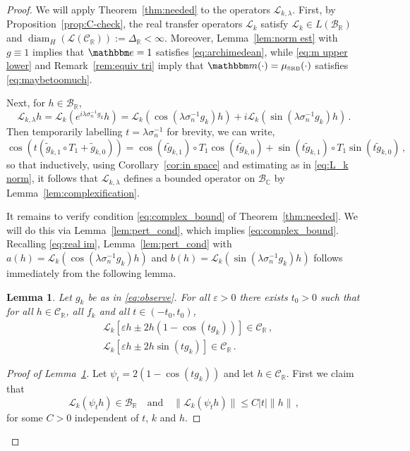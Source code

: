 \documentclass{amsart}
\numberwithin{equation}{section}
\newtheorem{lem}[thm]{Lemma}
\newcommand\cB{{\mathcal B}}
\newcommand\cC{{\mathcal C}}
\newcommand\cL{{\mathcal L}}
\newcommand\bC{{\mathbb C}}
\newcommand\bR{{\mathbb R}}
\newcommand\ve{\varepsilon}
\newcommand{\bbe}{\mathbbm e}
\newcommand{\bbm}{\mathbbm m}
\newcommand{\musrb}{\mu_{\mbox{\tiny SRB}}}
\newcommand{\diam}{\operatorname{diam}}
\begin{document}
\begin{proof}
We will apply Theorem~\ref{thm:needed} to the operators $\cL_{k, \lambda}$.
First, by Proposition~\ref{prop:C-check}, the real transfer operators $\cL_k$ satisfy
$\cL_k \in L(\cB_{\bR})$ and $\diam_H(\cL(\cC_{\bR})) := \Delta_{\bR} < \infty$.
Moreover, Lemma~\ref{lem:norm est} with $g \equiv 1$ implies that $\bbe = 1$ satisfies
\eqref{eq:archimedean}, while \eqref{eq:m upper lower} and Remark~\ref{rem:equiv tri}
imply that $\bbm( \cdot) = \musrb(\cdot)$ satisfies \eqref{eq:maybetoomuch}.

Next, for $h \in \cB_{\bR}$,
\begin{equation}
\label{eq:real im}
\cL_{k, \lambda} h = \cL_k (e^{i \lambda \sigma_n^{-1} g_k} h) = \cL_k( \cos(\lambda \sigma_n^{-1} g_k) h) + i \cL_k( \sin(\lambda \sigma_n^{-1} g_k) h ) \, .
\end{equation} 
Then temporarily labelling $t = \lambda \sigma_n^{-1}$ for brevity, we can write, 
\[
\cos (t (\tilde g_{k,1} \circ T_1 + \tilde g_{k,0}) )
= \cos (t \tilde g_{k,1}) \circ T_1 \cos(t \tilde g_{k,0}) + \sin (t \tilde g_{k,1}) \circ T_1 \sin (t \tilde g_{k,0}) \, ,
\]
so that inductively, using Corollary~\ref{cor:in space} and estimating as in \eqref{eq:L_k norm},
it follows that $\cL_{k, \lambda}$ defines a bounded operator on $\cB_{\bC}$
by Lemma~\ref{lem:complexification}.

It remains to verify condition \eqref{eq:complex_bound} of Theorem~\ref{thm:needed}. We will do this via
Lemma~\ref{lem:pert_cond}, which implies \eqref{eq:complex_bound}.  Recalling
\eqref{eq:real im}, Lemma~\ref{lem:pert_cond} with $a(h) = \cL_k(\cos(\lambda \sigma_n^{-1} g_k) h)$ and
$b(h) = \cL_k( \sin(\lambda \sigma_n^{-1} g_k) h )$
follows immediately from the following lemma.

\begin{lem}
\label{lem:small pert check}
Let $g_k$ be as in \eqref{eq:observe}.
For all $\ve > 0$ there exists $t_0 > 0$ such that for all $h \in \cC_{\bR}$, all $f_k$ and all $t \in (-t_0, t_0)$,
\[
\begin{split}
& \cL_k  [\ve h \pm 2 h (1-\cos(t g_k) ) ] \in \cC_{\bR} \, ,\\
& \cL_k [\ve h \pm 2 h \sin(t g_k) ] \in \cC_{\bR} \, .
\end{split}
\]
\end{lem}

\begin{proof}[Proof of Lemma~\ref{lem:small pert check}]
Let $\psi_t = 2(1-\cos(t g_k))$ and let $h \in \cC_{\bR}$.  
First we claim that
\begin{equation}
\label{eq:O t}
\cL_k(\psi_t h) \in \cB_{\bR} \quad \mbox{and} \quad \| \cL_k (\psi_t h) \| \le C | t| \| h\| \, , 
\end{equation}
for some $C>0$ independent of $t$, $k$ and $h$.


\end{proof}
\end{proof}
\end{document}
